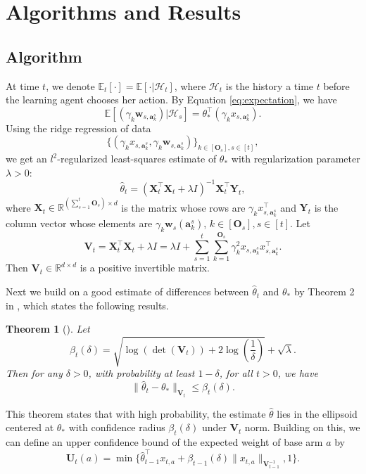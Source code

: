 \documentclass{article}
\newcommand{\EE}{\mathbb{E}}
\newcommand{\RR}{\mathbb{R}}
\newcommand{\ba}{\mathbf{a}}
\newcommand{\bO}{\mathbf{O}}
\newcommand{\bU}{\mathbf{U}}
\newcommand{\bV}{\mathbf{V}}
\newcommand{\bw}{\mathbf{w}}
\newcommand{\bX}{\mathbf{X}}
\newcommand{\bY}{\mathbf{Y}}
\newcommand{\cH}{\mathcal{H}}
\newcommand{\norm}[1]{\| #1 \|}
\newtheorem{theorem}{Theorem}[section]
\begin{document}
\section{Algorithms and Results}

\subsection{Algorithm}
	
At time $t$, we denote $\EE_t[\cdot] = \EE[\cdot | \cH_t]$, where $\cH_t$ is the history a time $t$ before the learning agent
	chooses her action. 
By Equation \eqref{eq:expectation}, we have 
$$
\EE[(\gamma_k \bw_{s,\ba_k^s}) | \cH_{s}] = \theta_*^{\top} (\gamma_k x_{s,\ba_k^s}).
$$
Using the ridge regression of data 
$$
\{(\gamma_k x_{s,\ba_k^s}, \gamma_k \bw_{s,\ba_k^s})\}_{k \in[\bO_s], s\in[t]},
$$
we get an $l^2$-regularized least-squares estimate of $\theta_*$ with regularization parameter $\lambda > 0$:
\begin{equation}
\hat{\theta}_t = (\bX_t^{\top}\bX_t + \lambda I)^{-1} \bX_t^{\top} \bY_t,
\end{equation}
where $\bX_t \in \RR^{(\sum_{s=1}^{t}\bO_s) \times d}$ is the matrix whose rows are $\gamma_k x_{s,\ba_k^s}^{\top}$ and $\bY_t$ is the column vector whose elements are $\gamma_k \bw_s(\ba_k^s)$, $k \in[\bO_s], s\in[t]$. Let
$$
\bV_t = \bX_t^{\top} \bX_t + \lambda I = \lambda I + \sum_{s=1}^{t} \sum_{k=1}^{\bO_s} \gamma_k^2 x_{s,\ba_k^s}x_{s,\ba_k^s}^{\top}.
$$
Then $\bV_t \in \RR^{d \times d}$ is a positive invertible matrix. 

Next we build on a good estimate of differences between $\hat{\theta}_t$ and $\theta_*$ by Theorem 2 in \cite{abbasi2011improved}, which states the following results.
	
\begin{theorem}[\cite{abbasi2011improved}]
\label{thm:theta_estimate}
Let 
$$
\beta_{t}(\delta) = \sqrt{\log(\det(\bV_{t})) + 2 \log\left(\frac{1}{\delta}\right)} + \sqrt{\lambda}.
$$
Then for any $\delta > 0$, with probability at least $1 - \delta$, for all $t > 0$, we have
\begin{equation}
\label{eq:estimateTheta}
\norm{\hat{\theta}_t - \theta_{\ast}}_{\bV_{t}} \leq \beta_{t}(\delta).
\end{equation}
\end{theorem}

This theorem states that with high probability, the estimate $\hat{\theta}$ lies in the ellipsoid centered at $\theta_*$  with confidence radius $\beta_t(\delta)$ under $\bV_t$ norm. Building on this, we can define an upper confidence bound of the expected weight of base arm $a$ by
\begin{equation}
\bU_t(a) = \min\{\hat{\theta}_{t-1}^{\top}x_{t,a} + \beta_{t-1}(\delta)\norm{x_{t,a}}_{\bV_{t-1}^{-1}}, 1\}.
\end{equation}
\end{document}

